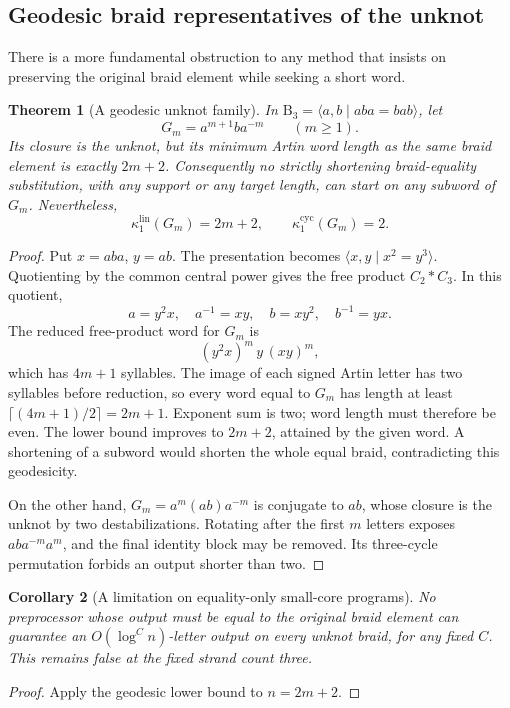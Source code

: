 \documentclass[11pt,a4paper]{article}
\newtheorem{theorem}{Theorem}[section]
\newtheorem{corollary}[theorem]{Corollary}
\theoremstyle{definition}\newtheorem{definition}[theorem]{Definition}
\theoremstyle{remark}\newtheorem{remark}[theorem]{Remark}
\newcommand{\B}{\mathrm B}
\newcommand{\kc}[1]{\kappa^{\mathrm{cyc}}_{#1}}
\newcommand{\kl}[1]{\kappa^{\mathrm{lin}}_{#1}}
\begin{document}
\subsection{Geodesic braid representatives of the unknot}
There is a more fundamental obstruction to any method that insists on
preserving the original braid element while seeking a short word.

\begin{theorem}[A geodesic unknot family]\label{thm:geodesic}
In $\B_3=\langle a,b\mid aba=bab\rangle$, let
\[
 G_m=a^{m+1}ba^{-m}\qquad(m\ge1).
\]
Its closure is the unknot, but its minimum Artin word length as the same
braid element is exactly $2m+2$. Consequently no strictly shortening
braid-equality substitution, with any support or any target length, can
start on any subword of $G_m$. Nevertheless,
\[
 \kl{1}(G_m)=2m+2,\qquad \kc{1}(G_m)=2.
\]
\end{theorem}
\begin{proof}
Put $x=aba$, $y=ab$. The presentation becomes
$\langle x,y\mid x^2=y^3\rangle$. Quotienting by the common central
power gives the free product $C_2*C_3$. In this quotient,
\[
 a=y^2x,\quad a^{-1}=xy,\quad b=xy^2,\quad b^{-1}=yx.
\]
The reduced free-product word for $G_m$ is
\[
 (y^2x)^m\,y\,(xy)^m,
\]
which has $4m+1$ syllables. The image of each signed Artin letter has two
syllables before reduction, so every word equal to $G_m$ has length at
least $\lceil(4m+1)/2\rceil=2m+1$. Exponent sum is two; word length must
therefore be even. The lower bound improves to $2m+2$, attained by the
given word. A shortening of a subword would shorten the whole equal braid,
contradicting this geodesicity.

On the other hand, $G_m=a^m(ab)a^{-m}$ is conjugate to $ab$, whose closure
is the unknot by two destabilizations. Rotating after the first $m$ letters
exposes $ab a^{-m}a^m$, and the final identity block may be removed.
Its three-cycle permutation forbids an output shorter than two.
\end{proof}

\begin{corollary}[A limitation on equality-only small-core programs]
No preprocessor whose output must be equal to the original braid element
can guarantee an $O(\log^C n)$-letter output on every unknot braid, for any
fixed $C$. This remains false at the fixed strand count three.
\end{corollary}
\begin{proof}
Apply the geodesic lower bound to $n=2m+2$.
\end{proof}
\end{document}
